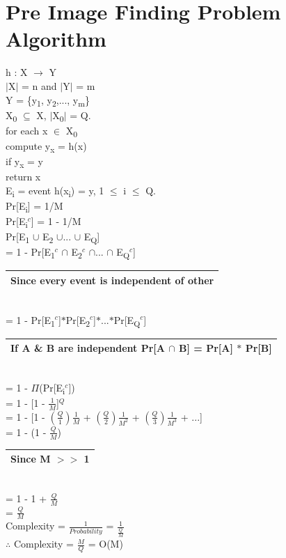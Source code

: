 \documentclass[11pt]{article}
\begin{document}
	\section{Pre Image Finding Problem Algorithm}
	h : X $\rightarrow$ Y\\
	$|$X$|$ = n and $|$Y$|$ = m\\
	Y = \{y\textsubscript{1}, y\textsubscript{2},..., y\textsubscript{m}\}\\
	X\textsubscript{0} $\subseteq$ X, $|$X\textsubscript{0}$|$ = Q.\\
	\hspace*{0.8cm}for each x $\in$ X\textsubscript{0}\\
	\hspace*{1.3cm}compute y\textsubscript{x} = h(x)\\
	\hspace*{1.3cm}if y\textsubscript{x} = y\\
	\hspace*{1.3cm}return x\\
	E\textsubscript{i} = event h(x\textsubscript{i}) = y, 1 $\leq$ i $\leq$ Q.\\
	Pr[E\textsubscript{i}] = 1/M\\
	Pr[E\textsubscript{i}$^c$] = 1 - 1/M\vspace{0.1cm}\\
	Pr[E\textsubscript{1} $\cup$ E\textsubscript{2} $\cup$... $\cup$ E\textsubscript{Q}] \\
	= 1 - Pr[E\textsubscript{1}$^c$ $\cap$ E\textsubscript{2}$^c$ $\cap$... $\cap$ E\textsubscript{Q}$^c$]\hfill 
	\begin{tabular}{| c |}
		\hline
		Since every event is independent of other\\
		\hline
	\end{tabular}\vspace{0.1cm}\\
	= 1 - Pr[E\textsubscript{1}$^c$]$\ast$Pr[E\textsubscript{2}$^c$]$\ast$...$\ast$Pr[E\textsubscript{Q}$^c$]\hfill 
	\begin{tabular}{| c |}
		\hline
		If A \& B are independent Pr[A $\cap$ B] = Pr[A] $\ast$ Pr[B]\\
		\hline
	\end{tabular}\\
	= 1 - $\Pi$(Pr[E\textsubscript{i}$^c$])\\
	= 1 - [1 - $\frac{1}{M}$]$^Q$\\
	= 1 - [1 - $(\frac{Q}{1})\frac{1}{M}$ +  $(\frac{Q}{2})\frac{1}{M^2}$ +  $(\frac{Q}{3})\frac{1}{M^3}$ + ...]\\
	= 1 - (1 -  $\frac{Q}{M}$) \hfill 
	\begin{tabular}{| c |}
		\hline
		Since M $>>$ 1\\
		\hline
	\end{tabular}\\
	= 1 - 1 +  $\frac{Q}{M}$\\
	= $\frac{Q}{M}$\\
	Complexity = $\frac{1}{Probability}$ = $\frac{1}{\frac{Q}{M}}$\\
	$\therefore$ Complexity = $\frac{M}{Q}$ = O(M)
	
\end{document}
